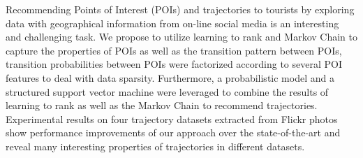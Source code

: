 Recommending Points of Interest (POIs) and trajectories to tourists by exploring data with 
geographical information from on-line social media is an interesting and challenging task.
We propose to utilize learning to rank and Markov Chain to capture the properties of POIs
as well as the transition pattern between POIs, transition probabilities between POIs were
factorized according to several POI features to deal with data sparsity.
Furthermore, a probabilistic model and a structured support vector machine were leveraged 
to combine the results of learning to rank as well as the Markov Chain to recommend trajectories.
Experimental results on four trajectory datasets extracted from Flickr photos show performance 
improvements of our approach over the state-of-the-art and reveal many interesting properties 
of trajectories in different datasets.
